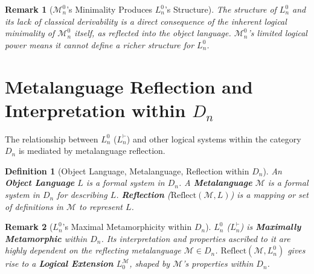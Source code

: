 \documentclass{article}
\newtheorem{definition}{Definition}[section] %
\newtheorem{remark}{Remark}[section] %
\begin{document}
																																																									\begin{remark}[$\mathcal{M}^0_n$'s Minimality Produces $L^0_n$'s Structure]
																																																										The structure of $L^0_n$ and its lack of classical derivability is a direct consequence of the inherent logical minimality of $\mathcal{M}^0_n$ itself, as reflected into the object language. $\mathcal{M}^0_n$'s limited logical power means it cannot define a richer structure for $L^0_n$.
																																																										\end{remark}
																																																											
																																																											\section{Metalanguage Reflection and Interpretation within $D_n$}
																																																											
																																																											The relationship between $L^0_n$ ($L^{\vdash}_n$) and other logical systems within the category $D_n$ is mediated by metalanguage reflection.
																																																											
																																																											\begin{definition}[Object Language, Metalanguage, Reflection within $D_n$]
																																																												An \textbf{Object Language} $L$ is a formal system in $D_n$. A \textbf{Metalanguage} $\mathcal{M}$ is a formal system in $D_n$ for describing $L$. \textbf{Reflection} ($\text{Reflect}(\mathcal{M}, L)$) is a mapping or set of definitions in $\mathcal{M}$ to represent $L$.
																																																												\end{definition}
																																																													
																																																													\begin{remark}[$L^0_n$'s Maximal Metamorphicity within $D_n$]
																																																														$L^0_n$ ($L^{\vdash}_n$) is \textbf{Maximally Metamorphic} within $D_n$. Its interpretation and properties ascribed to it are highly dependent on the reflecting metalanguage $\mathcal{M} \in D_n$. $\text{Reflect}(\mathcal{M}, L^0_n)$ gives rise to a \textbf{Logical Extension} $L_0^{\mathcal{M}}$, shaped by $\mathcal{M}$'s properties within $D_n$.
																																																														\end{remark}
																																																															
\end{document}
